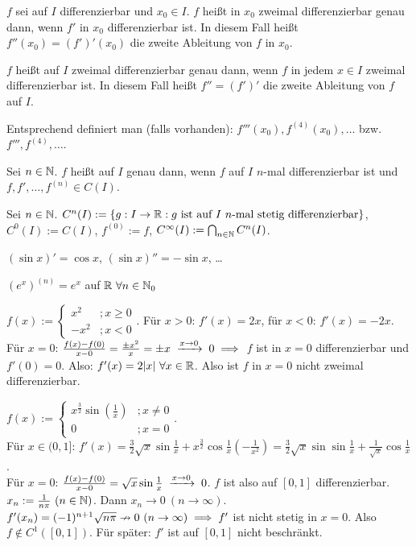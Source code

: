\documentclass[a4paper,twoside,DIV15,BCOR12mm]{scrbook}
\begin{document}
\begin{definition}
\begin{liste}
\item $f$ sei auf $I$ differenzierbar und $x_0 \in I$. $f$ heißt in $x_0$ zweimal differenzierbar genau dann, wenn $f'$ in $x_0$ differenzierbar ist. In diesem Fall heißt $f''(x_0) = (f')'(x_0)$ die zweite Ableitung von $f$ in $x_0$.
\item $f$ heißt auf $I$ zweimal differenzierbar genau dann, wenn $f$ in jedem $x\in I$ zweimal differenzierbar ist. In diesem Fall heißt $f''=(f')'$ die zweite Ableitung von $f$ auf $I$.
\item Entsprechend definiert man (falls vorhanden): $f'''(x_0), f^{(4)}(x_0),\ldots$ bzw. $f''', f^{(4)}, \ldots$.
\item Sei $n\in\mathbb{N}$. $f$ heißt auf $I$  genau dann, wenn $f$ auf $I$ $n$-mal differenzierbar ist und $f,f',\ldots,f^{(n)}\in C(I)$.
\item Sei $n\in\mathbb{N}$. $C^n(I) := \{ g:  I\to \MdR: g\text{ ist auf }I\ n\text{-mal stetig differenzierbar}\}$, $C^0(I) := C(I)$, $f^{(0)} := f$, $C^\infty(I) := \bigcap_{n\in\mathbb{N}}C^n(I)$.
\end{liste}
\end{definition}

\begin{beispiele}
\item $(\sin x)' = \cos x$, $(\sin x)'' = -\sin x$, \ldots
\item $(e^x)^{(n)} = e^x$ auf $\mathbb{R} \ \forall n\in\mathbb{N}_0$
\item $f(x) := \begin{cases}x^2 &; x\ge0 \\ -x^2 &; x<0\end{cases}$. Für $x>0$: $f'(x) = 2x$, für $x<0$: $f'(x) = -2x$. \\
Für $x=0$: $\frac{f(x)-f(0)}{x-0} = \frac{\pm x^2}{x} = \pm x \tomit{x\to 0} 0 \folgt$ $f$ ist in $x=0$ differenzierbar und $f'(0)=0$. Also: $f'(x)= 2|x|\ \forall x\in\mathbb{R}$. Also ist $f$ in $x=0$ nicht zweimal differenzierbar.
\item $f(x) := \begin{cases}x^{\frac{3}{2}}\sin(\frac{1}{x}) &; x\ne0 \\ 0 &; x=0\end{cases}$.  \\
Für $x\in(0,1]$: $f'(x) = \frac{3}{2}\sqrt{x}\sin\frac{1}{x} + x^{\frac{3}{2}}\cos\frac{1}{x}(-\frac{1}{x^2}) = \frac{3}{2}\sqrt{x}\sin\sin\frac{1}{x} + \frac{1}{\sqrt{x}} \cos \frac{1}{x}$. \\
Für $x=0$: $\frac{f(x)-f(0)}{x-0} = \sqrt{x}\sin\frac{1}{x} \tomit{x\to 0} 0$. $f$ ist also auf $[0,1]$ differenzierbar.\\
$x_n := \frac{1}{n\pi}\ (n\in\mathbb{N})$. Dann $x_n \to 0 \ (n\to\infty)$. $f'(x_n) = (-1)^{n+1}\sqrt{n\pi} \nrightarrow 0 \ (n\to \infty) \implies f'$ ist nicht stetig in $x=0$. Also $f\notin C^1([0,1])$. Für später: $f'$ ist auf $[0,1]$ nicht beschränkt.
\end{beispiele}
\end{document}
